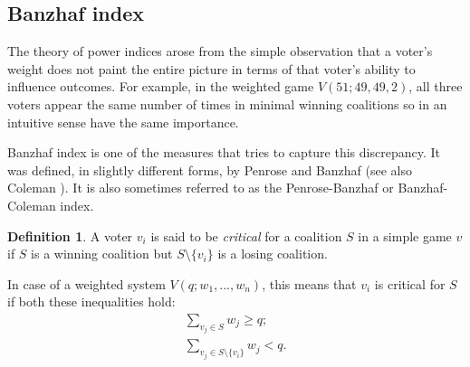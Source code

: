 \documentclass[11pt]{amsart}
\theoremstyle{plain}
\theoremstyle{definition}
\newtheorem{defin}[thm]{Definition}
\theoremstyle{remark}
\begin{document}
%
%
%
%
%
%



\subsection{Banzhaf index}\label{SS:Banzhaf} The theory of power indices arose from the simple observation that a voter's weight does not paint the entire picture in terms of that voter's ability to influence outcomes. For example, in the weighted game $V(51; 49, 49, 2)$, all three voters appear the same number of times in minimal winning coalitions so in an intuitive sense have the same importance. 

Banzhaf index is one of the measures that tries to capture this discrepancy. It was defined, in slightly different forms, by Penrose \cite{Pen46} and Banzhaf \cite{Ban65} (see also Coleman \cite{Col71}). It is also sometimes referred to as the Penrose-Banzhaf or Banzhaf-Coleman index. 

\begin{defin}
A voter $v_i$ is said to be \emph{critical} for a coalition $S$ in a simple game $v$ if $S$ is a winning coalition but $S\setminus \{v_i\}$ is a losing coalition.
\end{defin}


In case of a weighted system $V(q; w_1,...,w_n)$, this means that $v_i$ is critical for $S$ if both these inequalities hold:
\begin{align*}
\sum_{v_j\in S}w_j\geq q; \\
 \sum_{v_j\in S\setminus \{v_i\}}w_j<q.
 \end{align*}
\end{document}
